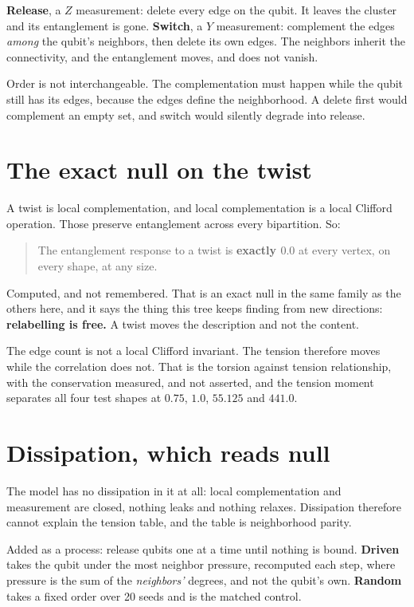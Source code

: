 \textbf{Release}, a \(Z\) measurement: delete every edge on the qubit. It leaves the cluster and its
entanglement is gone. \textbf{Switch}, a \(Y\) measurement: complement the edges \emph{among} the
qubit's neighbors, then delete its own edges. The neighbors inherit the connectivity, and the
entanglement moves, and does not vanish.

Order is not interchangeable. The complementation must happen while the qubit still has its edges,
because the edges define the neighborhood. A delete first would complement an empty set, and switch
would silently degrade into release.

\section{The exact null on the twist}

A twist is local complementation, and local complementation is a local Clifford operation. Those
preserve entanglement across every bipartition. So:

\begin{quote}
The entanglement response to a twist is \textbf{exactly \(0.0\)} at every vertex, on every shape, at
any size.
\end{quote}

Computed, and not remembered. That is an exact null in the same family as the others here, and it
says the thing this tree keeps finding from new directions: \textbf{relabelling is free.} A twist
moves the description and not the content.

The edge count is not a local Clifford invariant. The tension therefore moves while the correlation does
not. That is the torsion against tension relationship, with the conservation measured, and not
asserted, and the tension moment separates all four test shapes at \(0.75\), \(1.0\), \(55.125\) and
\(441.0\).

\section{Dissipation, which reads null}

The model has no dissipation in it at all: local complementation and measurement are closed, nothing
leaks and nothing relaxes. Dissipation therefore cannot explain the tension table, and the table is
neighborhood parity.

Added as a process: release qubits one at a time until nothing is bound. \textbf{Driven} takes the
qubit under the most neighbor pressure, recomputed each step, where pressure is the sum of the
\emph{neighbors'} degrees, and not the qubit's own. \textbf{Random} takes a fixed order over 20
seeds and is the matched control.

